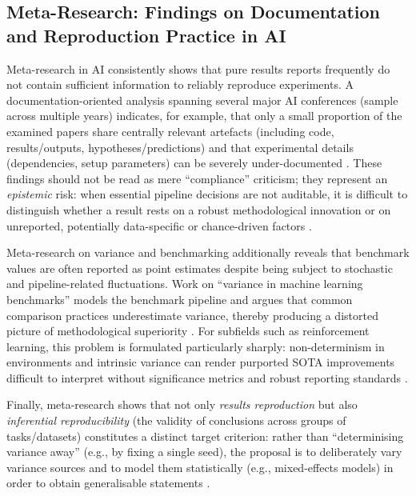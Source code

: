 \documentclass[12pt, a4paper]{article}
\begin{document}
\subsection{Meta-Research: Findings on Documentation and Reproduction
            Practice in AI}
\label{sec:metaresearch}

Meta-research in AI consistently shows that pure results reports
frequently do not contain sufficient information to reliably reproduce
experiments.  A documentation-oriented analysis spanning several major AI
conferences (sample across multiple years) indicates, for example, that
only a small proportion of the examined papers share centrally relevant
artefacts (including code, results/outputs, hypotheses/predictions) and
that experimental details (dependencies, setup parameters) can be
severely under-documented \cite{Gundersen2020}.  These findings should
not be read as mere ``compliance'' criticism; they represent an
\emph{epistemic} risk: when essential pipeline decisions are not auditable,
it is difficult to distinguish whether a result rests on a robust
methodological innovation or on unreported, potentially data-specific or
chance-driven factors \cite{Goodman2016}.

Meta-research on variance and benchmarking additionally reveals that
benchmark values are often reported as point estimates despite being
subject to stochastic and pipeline-related fluctuations.  Work on
``variance in machine learning benchmarks'' models the benchmark
pipeline and argues that common comparison practices underestimate
variance, thereby producing a distorted picture of methodological
superiority \cite{Bouthillier2021}.  For subfields such as reinforcement
learning, this problem is formulated particularly sharply:
non-determinism in environments and intrinsic variance can render
purported SOTA improvements difficult to interpret without significance
metrics and robust reporting standards \cite{Henderson2018}.

Finally, meta-research shows that not only \emph{results reproduction}
but also \emph{inferential reproducibility} (the validity of
conclusions across groups of tasks/datasets) constitutes a distinct
target criterion: rather than ``determinising variance away'' (e.g., by
fixing a single seed), the proposal is to deliberately vary variance
sources and to model them statistically (e.g., mixed-effects models) in
order to obtain generalisable statements \cite{Hagmann2023}.
\end{document}
